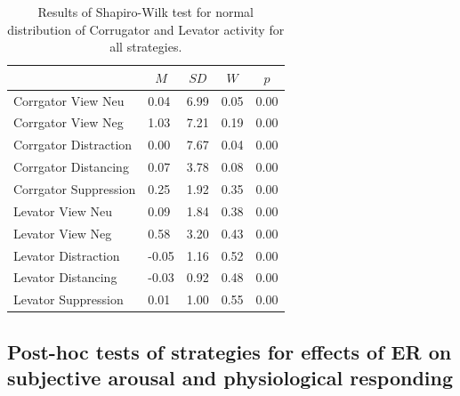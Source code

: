 \documentclass[
  man,floatsintext]{apa6}
\begin{document}
\begin{table}[H]

\begin{center}
\begin{threeparttable}

\caption{\label{tab:TabNV}Results of Shapiro-Wilk test for normal distribution of Corrugator and Levator activity for all strategies.}

\begin{tabular}{lllll}
\toprule
 & \multicolumn{1}{c}{$M$} & \multicolumn{1}{c}{$SD$} & \multicolumn{1}{c}{$W$} & \multicolumn{1}{c}{$p$}\\
\midrule
Corrgator View Neu & 0.04 & 6.99 & 0.05 & 0.00\\
Corrgator View Neg & 1.03 & 7.21 & 0.19 & 0.00\\
Corrgator Distraction & 0.00 & 7.67 & 0.04 & 0.00\\
Corrgator Distancing & 0.07 & 3.78 & 0.08 & 0.00\\
Corrgator Suppression & 0.25 & 1.92 & 0.35 & 0.00\\
Levator View Neu & 0.09 & 1.84 & 0.38 & 0.00\\
Levator View Neg & 0.58 & 3.20 & 0.43 & 0.00\\
Levator Distraction & -0.05 & 1.16 & 0.52 & 0.00\\
Levator Distancing & -0.03 & 0.92 & 0.48 & 0.00\\
Levator Suppression & 0.01 & 1.00 & 0.55 & 0.00\\
\bottomrule
\end{tabular}

\end{threeparttable}
\end{center}

\end{table}

\newpage

\hypertarget{SupplementEffectER}{%
\subsection{Post-hoc tests of strategies for effects of ER on subjective arousal and physiological responding}\label{SupplementEffectER}}
\end{document}
